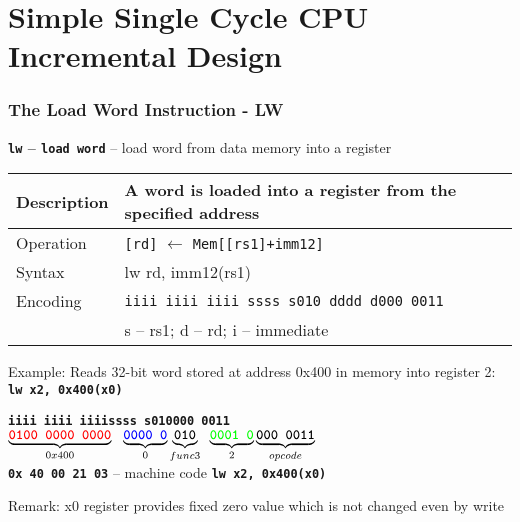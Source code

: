 \documentclass{beamer}
\begin{document}
\section{Simple Single Cycle CPU Incremental Design}

\begin{frame}
\frametitle{The Load Word Instruction - LW}

\textbf{\texttt{lw} -- \texttt{load word}} -- load word from data memory into a register

\begin{tabular}{|l|l|}\hline
Description & A word is loaded into a register from the specified address \\ \hline
Operation & \texttt{[rd]} $\leftarrow$ \texttt{Mem[[rs1]+imm12]} \\ \hline
Syntax & lw rd, imm12(rs1) \\ \hline
Encoding & \texttt{iiii iiii iiii ssss s010 dddd d000 0011} \\ \hline
 & s -- rs1; d -- rd; i -- immediate \\ \hline
\end{tabular}

\bigskip

Example: Reads 32-bit word stored at address 0x400 in memory into register 2:\\
\textbf{\texttt{lw x2, 0x400(x0)}}

\textbf{\texttt{\color{red}iiii iiii iiii}}\phantom{xx}\textbf{\texttt{\color{blue}ssss s}}\hspace{0.1cm}\textbf{\texttt{010\hspace{0.05cm}000 0011}}\\
$\underbrace{\textbf{\texttt{\color{red}0100 0000 0000}}}_{0x400}\texttt{ }\underbrace{\textbf{\texttt{\color{blue}0000 0}}}_{0}\underbrace{\textbf{\texttt{010}}}_{func3}\phantom{i}\underbrace{\textbf{\texttt{\color{green}0001 0}}}_{2}\underbrace{\textbf{\texttt{000 0011}}}_{opcode}$\\

\textbf{\texttt{0x 40 00 21 03}} -- machine code \textbf{\texttt{lw x2, 0x400(x0)}}

Remark: x0 register provides fixed zero value which is not changed even by write

\end{frame}
\end{document}
